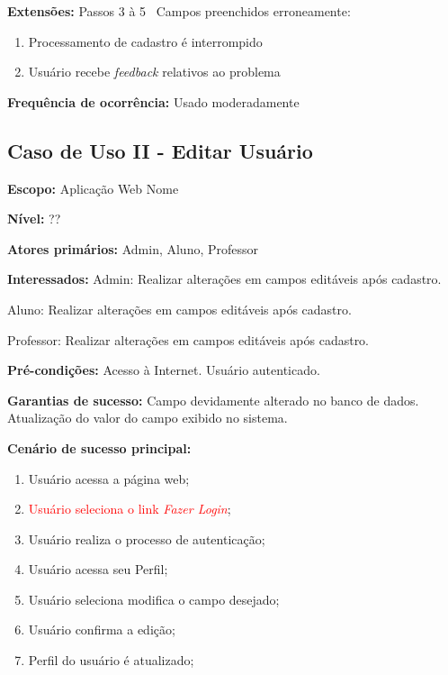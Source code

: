 \documentclass[12pt,oneside,a4paper,article]{abntex2}
\begin{document}
		\textbf{Extensões:} Passos 3 à 5 \textrightarrow \ Campos preenchidos erroneamente:
		
			\begin{enumerate}[label=\alph*.]	
				\item Processamento de cadastro é interrompido
				\item Usuário recebe \textit{feedback} relativos ao problema	
			\end{enumerate}
		
		\textbf{Frequência de ocorrência:} Usado moderadamente
			
		\subsection{Caso de Uso II - Editar Usuário}
		
		\textbf{Escopo:} Aplicação Web Nome
		
		\textbf{Nível:} ??
		
		\textbf{Atores primários:} Admin, Aluno, Professor
		
		\textbf{Interessados:} Admin: Realizar alterações em campos editáveis após cadastro.
		
		Aluno: Realizar alterações em campos editáveis após cadastro.
		
		Professor: Realizar alterações em campos editáveis após cadastro.
		
		\textbf{Pré-condições:} Acesso à Internet. Usuário autenticado.
		
		\textbf{Garantias de sucesso:} Campo devidamente alterado no banco de dados. Atualização do valor do campo exibido no sistema. 
		
		\textbf{Cenário de sucesso principal:}
		
		\begin{enumerate}
			\item Usuário acessa a página web;
			
			\item \textcolor{red}{Usuário seleciona o link \textit{Fazer Login}};
			
			\item Usuário realiza o processo de autenticação;
			
			\item Usuário acessa seu Perfil;
			
			\item Usuário seleciona modifica o campo desejado;
			
			\item Usuário confirma a edição;
			
			\item Perfil do usuário é atualizado;
			
		\end{enumerate}
		
\end{document}
